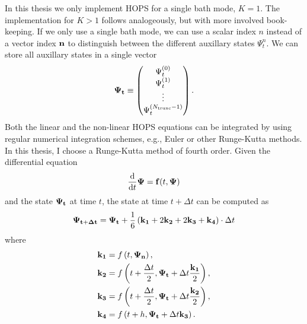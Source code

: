 In this thesis we only implement HOPS for a single bath mode, $K = 1$. 
The implementation for $K > 1$ follows analogeously, but with more involved book-keeping.
If we only use a single bath mode, we can use a scalar index $n$ instead of a vector index $\vectorbold{n}$ to
distinguish between the different auxillary states $\Psi_t^n$. We can store all auxillary states in
a single vector
\begin{equation*}
    \vb{\Psi_t} \equiv
    \begin{pmatrix}
    \Psi_t^{(0)} \\
    \Psi_t^{(1)} \\
    \vdots \\
    \Psi_t^{(N_\text{trunc}-1)} \\
    \end{pmatrix}.
\end{equation*}
Both the linear and the non-linear HOPS equations can be integrated by using regular numerical integration schemes,
e.g., Euler or other Runge-Kutta methods. In this thesis, I choose a Runge-Kutta method of fourth order. Given the differential equation
\begin{equation}
    \label{eq:Runge_Kutta}
    \frac{\text{d}}{\text{d}t} \vb{\Psi} = \vb{f}(t, \vb{\Psi})
\end{equation}
and the state $\vb{\Psi_t}$ at time $t$, the state at time $t + \Delta t$ can be computed as
\begin{equation*}
    \vb{\Psi_{t+\Delta t}} = \vb{\Psi_t} + \frac{1}{6}\left(\vb{k_1} + 2\vb{k_2} + 2\vb{k_3} + \vb{k_4}\right)\cdot \Delta t
\end{equation*}
where
\begin{equation*}
\begin{split}
    \vb{k_1} & = f\left(t, \vb{\Psi_n}\right), \\
    \vb{k_2} & = f\left(t + \frac{\Delta t}{2}, \vb{\Psi_t} + \Delta t\frac{\vb{k_1}}{2}\right), \\
    \vb{k_3} & = f\left(t + \frac{\Delta t}{2}, \vb{\Psi_t} + \Delta t\frac{\vb{k_2}}{2}\right), \\
    \vb{k_4} & = f\left(t + h, \vb{\Psi_t} + \Delta t\vb{k_3}\right).
\end{split}
\end{equation*}

